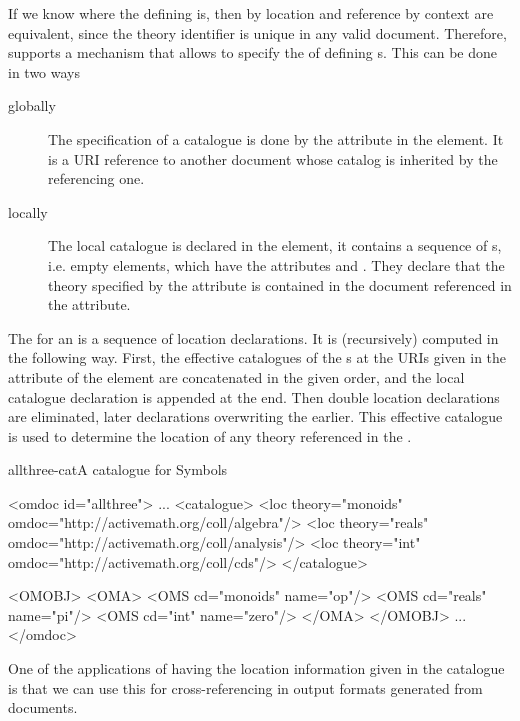 If we know where the defining {\omdoc} is, then
{} by location and reference by
context are equivalent, since the theory identifier is
unique in any valid {\omdoc} document. Therefore, {\omdoc} supports a
{} mechanism that allows to specify the {}
of defining {\omdoc}s.  This can be done in two ways
\begin{description}
\item[globally] The {} specification of a catalogue is done by
  the {} attribute in the {} element.
  It is a URI reference to another {\omdoc} document whose catalog is inherited
  by the referencing one.
\item[locally] The local catalogue is declared in the {}
  element, it contains a sequence of {s}, i.e. empty {}
  elements, which have the attributes {} and
  {}. They declare that the theory specified by the
  {} attribute is contained in the {\omdoc} document
  referenced in the {} attribute.
\end{description}
The {} for an {\omdoc} is
a sequence of location declarations. It is (recursively) computed in the following
way.  First, the effective catalogues of the {\omdoc}s at the URIs given in the
{} attribute of the {} element are
concatenated in the given order, and the local catalogue declaration is appended
at the end. Then double location declarations are eliminated, later declarations
overwriting the earlier. This effective catalogue is used to determine the
location of any theory referenced in the {\omdoc}.

\begin{myfig}{allthree-cat}{A catalogue for {\openmath} Symbols}\footnotesize
  \begin{boxedverbatim}
<omdoc id="allthree">
 ...
 <catalogue>
  <loc theory="monoids" omdoc="http://activemath.org/coll/algebra"/>
  <loc theory="reals" omdoc="http://activemath.org/coll/analysis"/>
  <loc theory="int" omdoc="http://activemath.org/coll/cds"/>
 </catalogue>

 <OMOBJ>
  <OMA>
   <OMS cd="monoids" name="op"/>
   <OMS cd="reals" name="pi"/>
   <OMS cd="int" name="zero"/>
  </OMA>
 </OMOBJ>
 ...
</omdoc>
\end{boxedverbatim}
\end{myfig}
One of the applications of having the location information given in the catalogue
is that we can use this for cross-referencing in output formats generated from
{\omdoc} documents.

